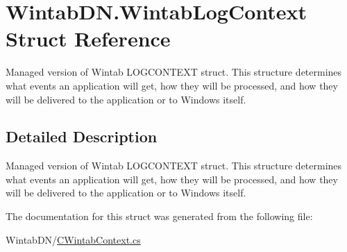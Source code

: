 \hypertarget{struct_wintab_d_n_1_1_wintab_log_context}{}\section{Wintab\+D\+N.\+Wintab\+Log\+Context Struct Reference}
\label{struct_wintab_d_n_1_1_wintab_log_context}


Managed version of Wintab L\+O\+G\+C\+O\+N\+T\+E\+XT struct. This structure determines what events an application will get, how they will be processed, and how they will be delivered to the application or to Windows itself.  




\subsection{Detailed Description}
Managed version of Wintab L\+O\+G\+C\+O\+N\+T\+E\+XT struct. This structure determines what events an application will get, how they will be processed, and how they will be delivered to the application or to Windows itself. 



The documentation for this struct was generated from the following file\+:\begin{DoxyCompactItemize}
\item 
Wintab\+D\+N/\mbox{\hyperlink{_c_wintab_context_8cs}{C\+Wintab\+Context.\+cs}}\end{DoxyCompactItemize}
